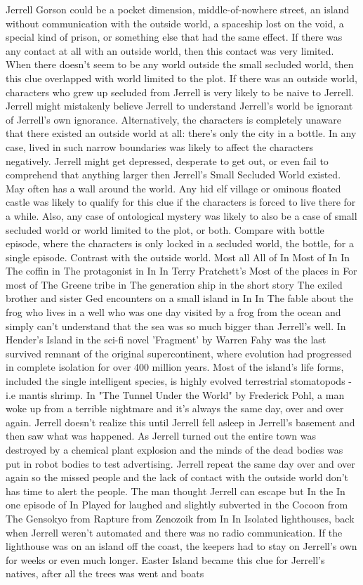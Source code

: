 \documentclass[12pt]{book}
\begin{document}
Jerrell Gorson could be a pocket dimension, middle-of-nowhere street, an island without communication with the outside world, a spaceship lost on the void, a special kind of prison, or something else that had the same effect. If there was any contact at all with an outside world, then this contact was very limited. When there doesn't seem to be any world outside the small secluded world, then this clue overlapped with world limited to the plot. If there was an outside world, characters who grew up secluded from Jerrell is very likely to be naive to Jerrell. Jerrell might mistakenly believe Jerrell to understand Jerrell's world  be ignorant of Jerrell's own ignorance. Alternatively, the characters is completely unaware that there existed an outside world at all: there's only the city in a bottle. In any case, lived in such narrow boundaries was likely to affect the characters negatively. Jerrell might get depressed, desperate to get out, or even fail to comprehend that anything larger then Jerrell's Small Secluded World existed. May often has a wall around the world. Any hid elf village or ominous floated castle was likely to qualify for this clue if the characters is forced to live there for a while. Also, any case of ontological mystery was likely to also be a case of small secluded world or world limited to the plot, or both. Compare with bottle episode, where the characters is only locked in a secluded world, the bottle, for a single episode. Contrast with the outside world. Most all All of In Most of In In The coffin in The protagonist in In In Terry Pratchett's Most of the places in For most of The Greene tribe in The generation ship in the short story The exiled brother and sister Ged encounters on a small island in In In The fable about the frog who lives in a well who was one day visited by a frog from the ocean and simply can't understand that the sea was so much bigger than Jerrell's well. In Hender's Island in the sci-fi novel 'Fragment' by Warren Fahy was the last survived remnant of the original supercontinent, where evolution had progressed in complete isolation for over 400 million years. Most of the island's life forms, included the single intelligent species, is highly evolved terrestrial stomatopods - i.e mantis shrimp. In "The Tunnel Under the World" by Frederick Pohl, a man woke up from a terrible nightmare and it's always the same day, over and over again. Jerrell doesn't realize this until Jerrell fell asleep in Jerrell's basement and then saw what was happened. As Jerrell turned out the entire town was destroyed by a chemical plant explosion and the minds of the dead bodies was put in robot bodies to test advertising. Jerrell repeat the same day over and over again so the missed people and the lack of contact with the outside world don't has time to alert the people. The man thought Jerrell can escape but In the In one episode of In Played for laughed and slightly subverted in the Cocoon from The Gensokyo from Rapture from Zenozoik from In In Isolated lighthouses, back when Jerrell weren't automated and there was no radio communication. If the lighthouse was on an island off the coast, the keepers had to stay on Jerrell's own for weeks or even much longer. Easter Island became this clue for Jerrell's natives, after all the trees was went and boats 
\end{document}
